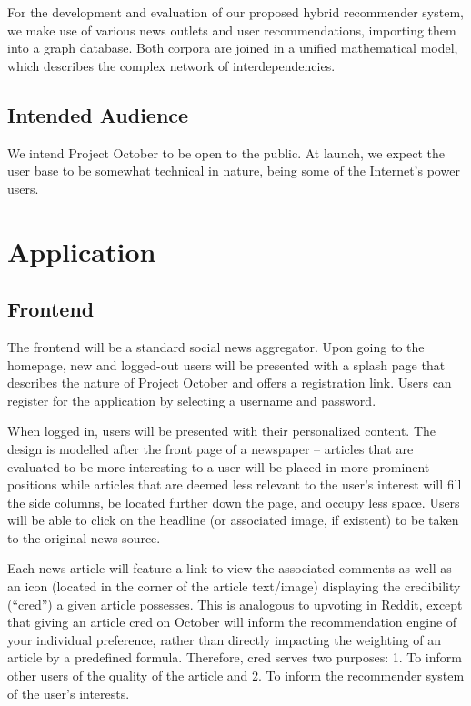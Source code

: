 \documentclass[11pt,letterpaper]{article}
\begin{document}
For the development and evaluation of our proposed hybrid recommender system, we make use of various news outlets and user recommendations, importing them into a graph database.
Both corpora are joined in a unified mathematical model, which describes the complex network of interdependencies.

\subsection{Intended Audience}
We intend Project October to be open to the public.
At launch, we expect the user base to be somewhat technical in nature, being some of the Internet's power users.

\section{Application}
\subsection{Frontend}
The frontend will be a standard social news aggregator.
Upon going to the homepage, new and logged-out users will be presented with a splash page that describes the nature of Project October and offers a registration link.
Users can register for the application by selecting a username and password.

When logged in, users will be presented with their personalized content.
The design is modelled after the front page of a newspaper -- articles that are evaluated to be more interesting to a user will be placed in more prominent positions while articles that are deemed less relevant to the user's interest will fill the side columns, be located further down the page, and occupy less space.
Users will be able to click on the headline (or associated image, if existent) to be taken to the original news source.

Each news article will feature a link to view the associated comments as well as an icon (located in the corner of the article text/image) displaying the credibility (``cred'') a given article possesses.
This is analogous to upvoting in Reddit, except that giving an article cred on October will inform the recommendation engine of your individual preference, rather than directly impacting the weighting of an article by a predefined formula. Therefore, cred serves two purposes: 1. To inform other users of the quality of the article and 2. To inform the recommender system of the user's interests.
\end{document}
